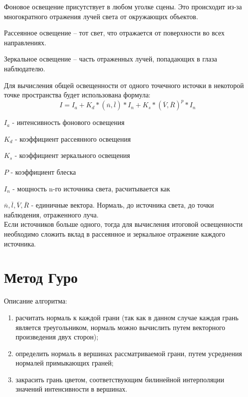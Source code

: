 \documentclass[12pt]{report}
\begin{document}
	Фоновое освещение присутствует в любом уголке сцены. Это происходит из-за многократного отражения лучей света от окружающих объектов. 
		
	Рассеянное освещение – тот свет, что отражается от поверхности во всех направлениях.
	
	Зеркальное освещение – часть отраженных лучей, попадающих в глаза наблюдателю.
	
	Для вычисления общей освещенности от одного точечного источки в некоторой точке пространства будет использована формула:
	\begin{equation}
		I = I_{a} + K_{d}*(\overline{n}, \overline{l})*I_{n} + K_{s}*(\overline{V}, \overline{R})^{p}*I_{n}
	\end{equation}
		
		$I_{a}$ - интенсивность фонового освещения
		
		$K_{d}$ - коэффициент рассеянного освещения
		
		$K_{s}$ - коэффициент зеркального освещения
		
		$P$ - коэффициент блеска
		
		$I_{n}$ - мощность n-го источника света, расчитывается как
		
		$\overline{n}, \overline{l}, \overline{V}, \overline{R}$ - единичные вектора. Нормаль, до источника света, до точки наблюдения, отраженного луча. 
		~\\
		
		Если источников больше одного, тогда для вычисления итоговой освещенности необходимо сложить вклад в рассеянное и зеркальное отражение каждого источника.
		
	\section{Метод Гуро}
	
	Описание алгоритма:
	
	\begin{enumerate}
		\item расчитать нормаль к каждой грани (так как в данном случае каждая грань является треугольником, нормаль можно вычислить путем векторного произведения двух сторон);
		\item определить нормаль в вершинах рассматриваемой грани, путем усреднения нормалей примыкающих граней;	
		\item закрасить грань цветом, соответствующим билинейной интерполяции значений интенсивности в вершинах.
	\end{enumerate}
\end{document}
